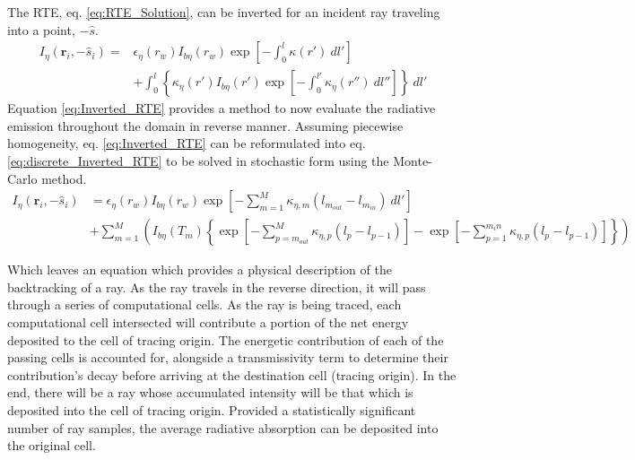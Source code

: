 The RTE, eq. \ref{eq:RTE_Solution}, can be inverted for an incident ray traveling into a point, $-\hat{s}$.
\begin{equation}
    \begin{aligned}
    I_\eta{}(\textbf{r}_i,-\hat{s}_i) = &\epsilon{}_\eta{}(r_w)I_{b\eta{}}(r_w)\exp{\left[-\int_0^l\kappa{}(r')~dl'\right]}\\
    &+\int_{0}^{l}{ \left\{ \kappa_\eta(r')I_{b\eta}(r')\exp{\left[-\int_0^{l'}\kappa_\eta(r'')~dl''\right]} \right\}}~dl'
    \label{eq:Inverted_RTE}
    \end{aligned}
\end{equation}
Equation \ref{eq:Inverted_RTE} provides a method to now evaluate the radiative emission throughout the domain in reverse manner.
Assuming piecewise homogeneity, eq. \ref{eq:Inverted_RTE} can be reformulated into eq. \ref{eq:discrete_Inverted_RTE} to be solved in stochastic form using the Monte-Carlo method.
\begin{equation}
    \begin{aligned}
    I_\eta{}(\textbf{r}_i,-\hat{s}_i)& = \epsilon{}_\eta{}(r_w)I_{b\eta{}}(r_w)\exp{\left[-\sum_{m=1}^M\kappa{}_{\eta{},m}(l_{m_{out}}-l_{m_{in}})~dl'\right]}\\
    &+\sum_{m=1}^M\left( I_{b\eta}(T_m)\left\{ \exp{\left[-\sum_{p=m_{out}}^M\kappa{}_{\eta{},p}(l_{p}-l_{p-1})\right]}- \exp{\left[-\sum_{p=1}^{m_in}\kappa{}_{\eta{},p}(l_{p}-l_{p-1})\right]} \right\} \right)
    \label{eq:discrete_Inverted_RTE}
    \end{aligned}
\end{equation}

Which leaves an equation which provides a physical description of the backtracking of a ray.
As the ray travels in the reverse direction, it will pass through a series of computational cells. 
As the ray is being traced, each computational cell intersected will contribute a portion of the net energy deposited to the cell of tracing origin. The energetic contribution of each of the passing cells is accounted for, alongside a transmissivity term to determine their contribution's decay before arriving at the destination cell (tracing origin).
In the end, there will be a ray whose accumulated intensity will be that which is deposited into the cell of tracing origin.
Provided a statistically significant number of ray samples, the average radiative absorption can be deposited into the original cell.


